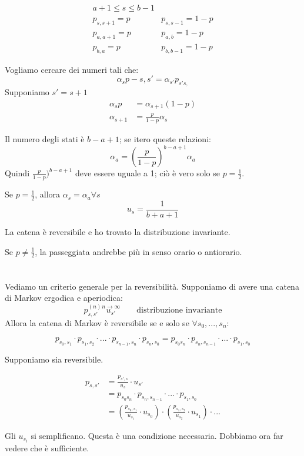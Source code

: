 \documentclass[a4paper,12pt]{book}
\begin{document}
$$ \begin{array}{cc}
	a+1 \le s \le b-1 & \\
	p_{s,s+1} = p & p_{s,s-1} = 1-p \\
	p_{a,a+1} = p & p_{a,b} = 1-p \\
	p_{b,a} = p & p_{b,b-1} = 1-p
\end{array}$$

Vogliamo cercare dei numeri tali che:
	$$ \alpha_{s}p-{s,s'} = \alpha_{s'} p_{s's,} $$
Supponiamo $ s' = s+1 $
\begin{align*}
	\alpha_{s} p & = \alpha_{s+1} (1-p) \\
	\alpha_{s+1} & = \frac{p}{1-p} \alpha_{s}
\end{align*}

Il numero degli stati è $ b-a+1 $; se itero queste relazioni:
$$ \alpha_a = \left(\frac{p}{1-p}\right)^{b-a+1}\alpha_a $$
Quindi $ \frac{p}{1-p})^{b-a+1} $ deve essere uguale a 1; ciò è vero solo se $ p = \frac{1}{2} $.

Se $ p = \frac{1}{2} $, allora $ \alpha_s = \alpha_a \forall s $
$$ u_s = \frac{1}{b+a+1}$$

La catena è reversibile e ho trovato la distribuzione invariante. 

Se $ p \ne \frac{1}{2} $, la passeggiata andrebbe più in senso orario o antiorario.
\\
\\
\\
Vediamo un criterio generale per la reversibilità. Supponiamo di avere una catena di Markov ergodica e aperiodica:
$$ p_{s,s'}^(n) \overset{n \to \infty}{u_{s'}} \qquad \text{distribuzione invariante} $$
Allora la catena di Markov è reversibile se e solo se $ \forall s_0, ..., s_n $:

$$ p_{s_0,s_1} \cdot p_{s_1, s_2} \cdot ... \cdot p_{s_{n-1}, s_n} \cdot p_{s_n , s_0} = p_{s_0 s_n} \cdot p_{s_n, s_{n-1}} \cdot ... \cdot p_{s_1, s_0} $$

Supponiamo sia reversibile.

\begin{align*}
	p_{s,s'} & = \frac{p_{s',s}}{u_s}\cdot u_{s'} \\
	& = p_{s_0 s_n} \cdot p_{s_n, s_{n-1}} \cdot ... \cdot p_{s_1, s_0} \\
	& = \left(\frac{p_{s_0, s_1}}{u_{s_1}}\cdot u_{s_0}\right) \cdot \left(\frac{p_{s_1, s_2}}{u_{s_2}}\cdot u_{s_1}\right) \cdot ...
\end{align*}

Gli $ u_{s_i} $ si semplificano. Questa è una condizione necessaria. Dobbiamo ora far vedere che è sufficiente. 
\end{document}
